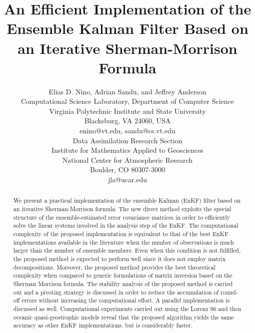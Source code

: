 \documentclass[12pt]{article}
\begin{document}
\newpage

\title{An Efficient Implementation of the Ensemble Kalman Filter Based on an Iterative Sherman-Morrison Formula}

\author{Elias D. Nino, Adrian Sandu, and Jeffrey Anderson \\
Computational Science Laboratory, Department of Computer Science \\
Virginia Polytechnic Institute and State University \\
Blacksburg, VA 24060, USA \\
enino@vt.edu, sandu@cs.vt.edu \\
Data Assimilation Research Section \\
Institute for Mathematics Applied to Geosciences \\
National Center for Atmospheric Research \\
Boulder, CO 80307-3000 \\
jla@ucar.edu}


\date{}
\maketitle
\tableofcontents


\begin{abstract}
We present a practical implementation of the ensemble Kalman (EnKF) filter based on an iterative Sherman-Morrison formula. 
The new direct method exploits the special structure of the ensemble-estimated error covariance matrices  in order to efficiently solve the linear systems  involved in the analysis step of the EnKF. The computational complexity of the proposed implementation is equivalent to that of the best EnKF implementations available in the literature when the number of observations is much larger than the number of ensemble members. Even when this condition is not fulfilled, the proposed method is expected to perform well since it does not employ matrix decompositions. Moreover, the proposed method provides the best theoretical complexity when compared to generic formulations of matrix inversion based on the Sherman Morrison formula. The stability analysis of the proposed method is carried out and a pivoting strategy is discussed in order to reduce the accumulation of round-off errors without increasing the computational effort. A parallel implementation is discussed as well. Computational experiments carried out using the Lorenz 96 and then oceanic quasi-geostrophic models reveal that the proposed algorithm yields the same accuracy as other EnKF implementations, but is considerably faster.
\end{abstract}
\end{document}
